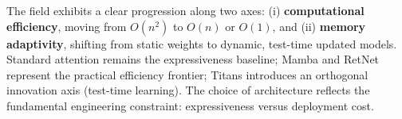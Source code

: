 The field exhibits a clear progression along two axes: (i) \textbf{computational efficiency}, moving from $O(n^2)$ to $O(n)$ or $O(1)$, and (ii) \textbf{memory adaptivity}, shifting from static weights to dynamic, test-time updated models. Standard attention remains the expressiveness baseline; Mamba and RetNet represent the practical efficiency frontier; Titans introduces an orthogonal innovation axis (test-time learning). The choice of architecture reflects the fundamental engineering constraint: expressiveness versus deployment cost.

